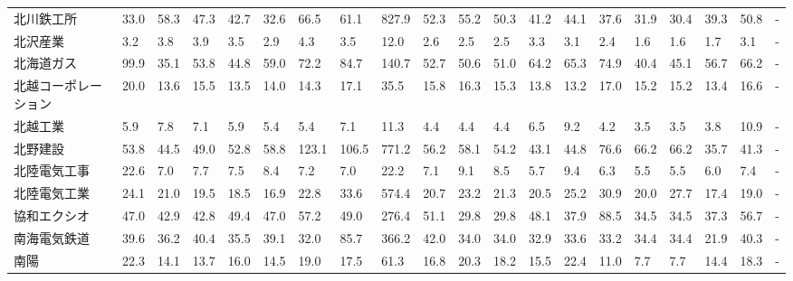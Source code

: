 \begin{tabular}{llllllllllllllllllll}
北川鉄工所           &   33.0 &   58.3 &      47.3 &      42.7 &       32.6 &    66.5 &    61.1 &    827.9 &    52.3 &    55.2 &   50.3 &   41.2 &    44.1 &    37.6 &    31.9 &   30.4 &   39.3 &    50.8 &      - \\
北沢産業            &    3.2 &    3.8 &       3.9 &       3.5 &        2.9 &     4.3 &     3.5 &     12.0 &     2.6 &     2.5 &    2.5 &    3.3 &     3.1 &     2.4 &     1.6 &    1.6 &    1.7 &     3.1 &      - \\
北海道ガス           &   99.9 &   35.1 &      53.8 &      44.8 &       59.0 &    72.2 &    84.7 &    140.7 &    52.7 &    50.6 &   51.0 &   64.2 &    65.3 &    74.9 &    40.4 &   45.1 &   56.7 &    66.2 &      - \\
北越コーポレーション      &   20.0 &   13.6 &      15.5 &      13.5 &       14.0 &    14.3 &    17.1 &     35.5 &    15.8 &    16.3 &   15.3 &   13.8 &    13.2 &    17.0 &    15.2 &   15.2 &   13.4 &    16.6 &      - \\
北越工業            &    5.9 &    7.8 &       7.1 &       5.9 &        5.4 &     5.4 &     7.1 &     11.3 &     4.4 &     4.4 &    4.4 &    6.5 &     9.2 &     4.2 &     3.5 &    3.5 &    3.8 &    10.9 &      - \\
北野建設            &   53.8 &   44.5 &      49.0 &      52.8 &       58.8 &   123.1 &   106.5 &    771.2 &    56.2 &    58.1 &   54.2 &   43.1 &    44.8 &    76.6 &    66.2 &   66.2 &   35.7 &    41.3 &      - \\
北陸電気工事          &   22.6 &    7.0 &       7.7 &       7.5 &        8.4 &     7.2 &     7.0 &     22.2 &     7.1 &     9.1 &    8.5 &    5.7 &     9.4 &     6.3 &     5.5 &    5.5 &    6.0 &     7.4 &      - \\
北陸電気工業          &   24.1 &   21.0 &      19.5 &      18.5 &       16.9 &    22.8 &    33.6 &    574.4 &    20.7 &    23.2 &   21.3 &   20.5 &    25.2 &    30.9 &    20.0 &   27.7 &   17.4 &    19.0 &      - \\
協和エクシオ          &   47.0 &   42.9 &      42.8 &      49.4 &       47.0 &    57.2 &    49.0 &    276.4 &    51.1 &    29.8 &   29.8 &   48.1 &    37.9 &    88.5 &    34.5 &   34.5 &   37.3 &    56.7 &      - \\
南海電気鉄道          &   39.6 &   36.2 &      40.4 &      35.5 &       39.1 &    32.0 &    85.7 &    366.2 &    42.0 &    34.0 &   34.0 &   32.9 &    33.6 &    33.2 &    34.4 &   34.4 &   21.9 &    40.3 &      - \\
南陽              &   22.3 &   14.1 &      13.7 &      16.0 &       14.5 &    19.0 &    17.5 &     61.3 &    16.8 &    20.3 &   18.2 &   15.5 &    22.4 &    11.0 &     7.7 &    7.7 &   14.4 &    18.3 &      - \\

\end{tabular}
